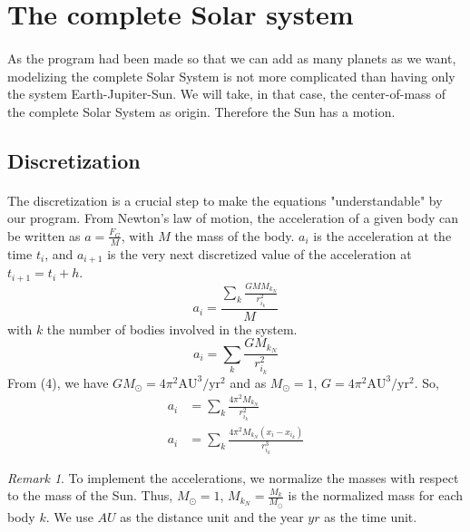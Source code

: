\documentclass[a4paper, twoside, 11pt]{report}
\theoremstyle{theorem}
\theoremstyle{remark}
\newtheorem{remark}{Remark}[chapter]
\theoremstyle{exemple}
\begin{document}
    \section{The complete Solar system}
        \paragraph{}As the program had been made so that we can add as many planets as we want, modelizing the complete Solar System is not more complicated than having only the system Earth-Jupiter-Sun. We will take, in that case, the center-of-mass of the complete Solar System as origin. Therefore the Sun has a motion.
        

    \subsection{Discretization}
    
    \paragraph{}The discretization is a crucial step to make the equations "understandable" by our program. From Newton's law of motion, the acceleration of a given body can be written as $a=\frac{F_G}{M}$, with $M$ the mass of the body. $a_i$ is the acceleration at the time $t_i$, and ${a}_{i+1}$ is the very next discretized value of the acceleration at ${t}_{i+1}={t}_{i}+h$.
                \begin{equation*}
                    a_i = \frac{ \sum\limits_{k} \frac{GMM_{k_N}}{r_{i_k}^2}}{M}
                \end{equation*}
            with $k$ the number of bodies involved in the system. 
                \begin{equation*}
                    a_i = \sum\limits_{k} \frac{GM_{k_N}}{r_{i_k}^2}
                \end{equation*}
            From (4), we have $GM_{\odot} = 4\pi^2\mathrm{AU}^3/\mathrm{yr}^2$ and as $M_{\odot}=1$, $G=4\pi^2\mathrm{AU}^3/\mathrm{yr}^2$. So,
                \begin{align*}
                    a_i &= \sum\limits_{k} \frac{4\pi^2M_{k_N}}{r_{i_k}^2} \\
                    a_i &= \sum\limits_{k} \frac{4\pi^2M_{k_N}(x_i-x_{i_k})}{r_{i_k}^3} 
                    \tag{10}
                 \end{align*}
                 
                     \begin{remark}
    	To implement the accelerations, we normalize the masses with respect to the mass of the Sun. Thus, $M_{\odot}=1$, $M_{k_N}=\frac{M_k}{M_{\odot}}$ is the normalized mass for each body $k$. We use $AU$ as the distance unit and the year $yr$ as the time unit.
	\end{remark}
	
\end{document}
